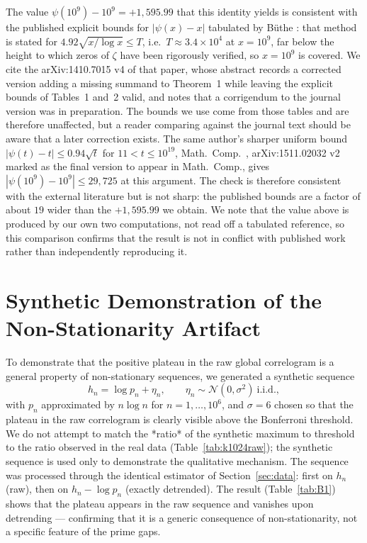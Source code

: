 \documentclass[11pt]{article}
\begin{document}
The value $\psi(10^9) - 10^9 = +1{,}595.99$ that this identity yields is
consistent with the published explicit bounds for $|\psi(x) - x|$
tabulated by B\"uthe \cite{Buthe2016}: that method is
stated for $4.92\sqrt{x/\log x} \leq T$, i.e.\ $T \approx 3.4
\times 10^4$ at $x = 10^9$, far below the height to which zeros of
$\zeta$ have been rigorously verified, so $x = 10^9$ is covered. We
cite the arXiv:1410.7015 v4 of that paper, whose abstract records a
corrected version adding a missing summand to Theorem~1 while leaving
the explicit bounds of Tables~1 and~2 valid, and notes that a
corrigendum to the journal version was in preparation. The bounds we
use come from those tables and are therefore unaffected, but a reader
comparing against the journal text should be aware that a later
correction exists. The
same author's sharper uniform bound $|\psi(t) - t| \leq 0.94\sqrt{t}$
for $11 < t \leq 10^{19}$, Math.\ Comp.\ \cite{Buthe2018}, arXiv:1511.02032
v2 marked as the final version to appear in Math.\ Comp., gives
$|\psi(10^9) - 10^9| \leq 29{,}725$ at this argument. The check is
therefore consistent with the external literature but is not sharp: the
published bounds are a factor of about $19$ wider than the
$+1{,}595.99$ we obtain. We note that the value above is produced by
our own two computations, not read off a tabulated reference, so this
comparison confirms that the result is not in conflict with published
work rather than independently reproducing it.

\section{Synthetic Demonstration of the Non-Stationarity Artifact}

\noindent To demonstrate that the positive plateau in the raw global
correlogram is a general property of non-stationary sequences, we
generated a synthetic sequence
\[
h_n = \log p_n + \eta_n, \qquad
\eta_n \sim \mathcal N(0, \sigma^2)\ \text{i.i.d.},
\]
with $p_n$ approximated by $n\log n$ for $n = 1, \ldots, 10^6$, and
$\sigma = 6$ chosen so that the plateau in the raw correlogram is
clearly visible above the Bonferroni threshold. We do not attempt to
match the *ratio* of the synthetic maximum to threshold to the ratio
observed in the real data (Table~\ref{tab:k1024raw}); the synthetic
sequence is used only to demonstrate the qualitative mechanism. The
sequence was processed through the identical estimator of
Section~\ref{sec:data}: first on $h_n$ (raw), then on
$h_n - \log p_n$ (exactly detrended). The result
(Table~\ref{tab:B1}) shows that the plateau appears in the raw
sequence and vanishes upon detrending --- confirming that it is a
generic consequence of non-stationarity, not a specific feature of
the prime gaps.
\end{document}

